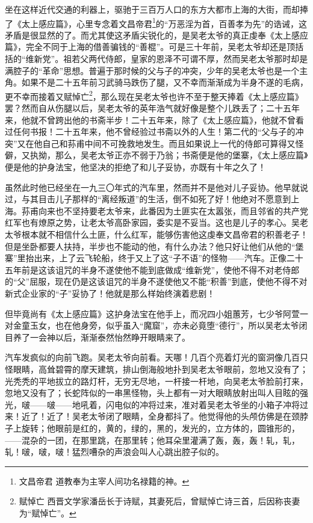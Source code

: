 \par 坐在这样近代交通的利器上，驱驰于三百万人口的东方大都市上海的大街，而却捧了《太上感应篇》，心里专念着文昌帝君\footnote{文昌帝君 道教奉为主宰人间功名禄籍的神。}的“万恶淫为首，百善孝为先”的诰诫，这矛盾是很显然的了。而尤其使这矛盾尖锐化的，是吴老太爷的真正虔奉《太上感应篇》，完全不同于上海的借善骗钱的“善棍”。可是三十年前，吴老太爷却还是顶括括的“维新党”。祖若父两代侍郎，皇家的恩泽不可谓不厚，然而吴老太爷那时却是满腔子的“革命”思想。普遍于那时候的父与子的冲突，少年的吴老太爷也是一个主角。如果不是二十五年前习武骑马跌伤了腿，又不幸而渐渐成为半身不遂的毛病，更不幸而接着又赋悼亡\footnote{赋悼亡 西晋文学家潘岳长于诗赋，其妻死后，曾赋悼亡诗三首，后因称丧妻为“赋悼亡”。}，那么现在吴老太爷也许不至于整天捧着《太上感应篇》罢？然而自从伤腿以后，吴老太爷的英年浩气就好像是整个儿跌丢了；二十五年来，他就不曾跨出他的书斋半步！二十五年来，除了《太上感应篇》，他就不曾看过任何书报！二十五年来，他不曾经验过书斋以外的人生！第二代的“父与子的冲突”又在他自己和荪甫中间不可挽救地发生。而且如果说上一代的侍郎可算得又怪僻，又执拗，那么，吴老太爷正亦不弱于乃翁；书斋便是他的堡寨，《太上感应篇》便是他的护身法宝，他坚决的拒绝了和儿子妥协，亦既有十年之久了！
\par 虽然此时他已经坐在一九三〇年式的汽车里，然而并不是他对儿子妥协。他早就说过，与其目击儿子那样的“离经叛道”的生活，倒不如死了好！他绝对不愿意到上海。荪甫向来也不坚持要老太爷来，此番因为土匪实在太嚣张，而且邻省的共产党红军也有燎原之势，让老太爷高卧家园，委实是不妥当。这也是儿子的孝心。吴老太爷根本就不相信什么土匪，什么红军，能够伤害他这虔奉文昌帝君的积善老子！但是坐卧都要人扶持，半步也不能动的他，有什么办法？他只好让他们从他的“堡寨”里抬出来，上了云飞轮船，终于又上了这“子不语”的怪物——汽车。正像二十五年前是这该诅咒的半身不遂使他不能到底做成“维新党”，使他不得不对老侍郎的“父”屈服，现在仍是这该诅咒的半身不遂使他又不能“积善”到底，使他不得不对新式企业家的“子”妥协了！他就是那么样始终演着悲剧！
\par 但毕竟尚有《太上感应篇》这护身法宝在他手上，而况四小姐蕙芳，七少爷阿萱一对金童玉女，也在他身旁，似乎虽入“魔窟”，亦未必竟堕“德行”，所以吴老太爷闭目养了一会神以后，渐渐泰然怡然睁开眼睛来了。
\par 汽车发疯似的向前飞跑。吴老太爷向前看。天哪！几百个亮着灯光的窗洞像几百只怪眼睛，高耸碧霄的摩天建筑，排山倒海般地扑到吴老太爷眼前，忽地又没有了；光秃秃的平地拔立的路灯杆，无穷无尽地，一杆接一杆地，向吴老太爷脸前打来，忽地又没有了；长蛇阵似的一串黑怪物，头上都有一对大眼睛放射出叫人目眩的强光，啵——啵——地吼着，闪电似的冲将过来，准对着吴老太爷坐的小箱子冲将过来！近了！近了！吴老太爷闭了眼睛，全身都抖了。他觉得他的头颅仿佛是在颈脖子上旋转；他眼前是红的，黄的，绿的，黑的，发光的，立方体的，圆锥形的，——混杂的一团，在那里跳，在那里转；他耳朵里灌满了轰，轰，轰！轧，轧，轧！啵，啵，啵！猛烈嘈杂的声浪会叫人心跳出腔子似的。
